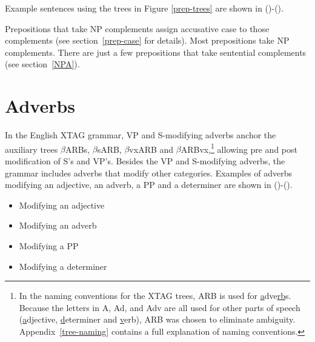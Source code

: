 Example sentences using the trees in Figure \ref{prep-trees} are shown
in ()-().



Prepositions that take NP complements assign accusative case to those
complements (see section~\ref{prep-case} for details).  Most prepositions take
NP complements.  There are just a few prepositions that take sentential
complements (see section~\ref{NPA}).



\section{Adverbs}
\label{adv-modifier}

In the English XTAG grammar, VP and S-modifying adverbs anchor the auxiliary
trees $\beta$ARBs, $\beta$sARB, $\beta$vxARB and $\beta$ARBvx,\footnote{In the
naming conventions for the XTAG trees, ARB is used for {\underline
a}dve{\underline {rb}}s.  Because the letters in A, Ad, and Adv are all used
for other parts of speech ({\underline a}djective, {\underline d}eterminer and
{\underline v}erb), ARB was chosen to eliminate ambiguity.
Appendix~\ref{tree-naming} contains a full explanation of naming conventions.}
allowing pre and post modification of S's and VP's.  Besides the VP and
S-modifying adverbs, the grammar includes adverbs that modify other
categories. Examples of adverbs modifying an adjective, an adverb, a
PP and a determiner are
shown in ()-().

\begin{itemize}
\item{Modifying an adjective}

\item{Modifying an adverb}

\item{Modifying a PP}

\item{Modifying a determiner}

\end{itemize}

